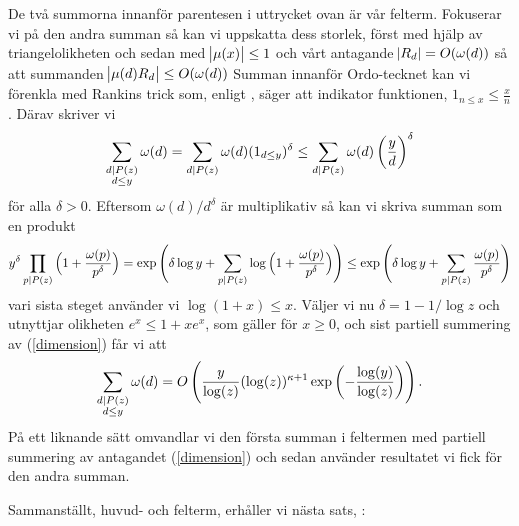 De två summorna innanför parentesen i uttrycket ovan är vår felterm. Fokuserar vi på den andra summan så kan vi uppskatta dess storlek, först med hjälp av triangelolikheten och sedan med $\abs{\mu(x)} \leq 1$ och vårt antagande $\abs{R_d} = O(\omega(d))$ så att summanden \(\abs{ \mu(d) R_d} \leq O(\omega(d))\)
Summan innanför Ordo-tecknet kan vi förenkla med Rankins trick som, enligt \cite[s.68]{cojocarumurty}, säger att indikator funktionen, \(1_{n \leq x} \leq \frac{x}{n}\). Därav skriver vi 
\begin{align*}
    \sum_{\substack{d \mid P(z)  \\ d \leq y}} \omega(d) =
    \sum_{\substack{d \mid P(z)}} \omega(d) (1_{d \leq y})^{\delta} \leq
    \sum_{\substack{d \mid P(z)}} \omega(d) \left(\frac{y}{d}\right)^{\delta}  
\end{align*}
för alla \(\delta > 0\). Eftersom \(\omega(d) / d^\delta\) är multiplikativ så kan vi skriva summan som en produkt
\begin{align*}
    y^\delta \prod_{p \mid P(z)} \Big(1 + \frac{\omega(p)}{p^\delta} \Big) =
    \exp \Bigg(\delta \log y + \sum_{p \mid P(z)} \log\Big(1 + \frac{\omega(p)}{p^\delta} \Big) \Bigg) \leq 
    \exp \Bigg(\delta \log y + \sum_{p \mid P(z)} \frac{\omega(p)}{p^\delta} \Bigg)
\end{align*}
vari sista steget använder vi \(\log(1 + x) \leq x\). Väljer vi nu \(\delta = 1 - 1/\log z\) och utnyttjar olikheten \(e^x \leq 1 + x e^x\), som gäller för $x \geq 0$, och sist partiell summering av (\ref{dimension}) får vi att
\begin{align*}
    \sum_{\substack{d \mid P(z)  \\ d \leq y}} \omega(d) = O\left( \frac{y}{\log(z)} (\log(z))^{\kappa + 1} \exp{\left(- \frac{\log(y)}{\log(z)} \right)} \right).
\end{align*}
På ett liknande sätt omvandlar vi den första summan i feltermen med partiell summering av antagandet (\ref{dimension}) och sedan använder resultatet vi fick för den andra summan. 

Sammanställt, huvud- och felterm, erhåller vi nästa sats, \cite[Sats 5.4.1]{cojocarumurty}:

